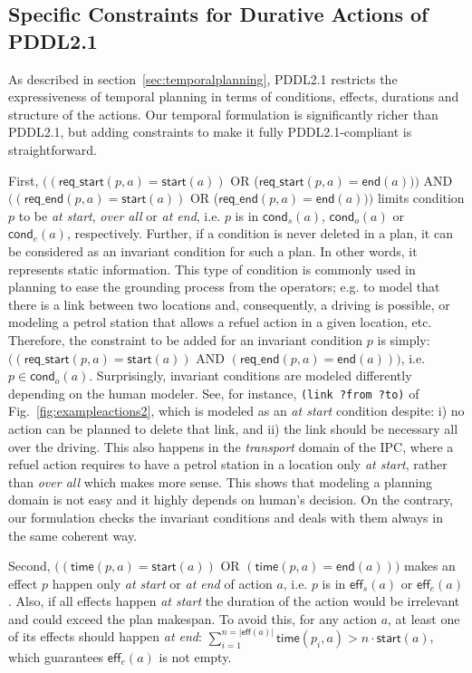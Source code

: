 \documentclass[runningheads]{llncs}
\newcommand{\eff}{\mathsf{eff}}    %
\newcommand{\cond}{\mathsf{cond}}  %
\newcommand{\start}{\mathsf{start}}%
\newcommand{\en}{\mathsf{end}}     %
\newcommand{\tim}{\mathsf{time}}   %
\newcommand{\reqs}{\mathsf{req\_{start}}} %
\newcommand{\reqe}{\mathsf{req\_{end}}}   %
\begin{document}
\subsection{Specific Constraints for Durative Actions of PDDL2.1}
\label{sec:PDDL21constraints}

As described in section~\ref{sec:temporalplanning}, PDDL2.1 restricts the expressiveness of temporal planning in terms of conditions, effects, durations and structure of the actions. Our temporal formulation is significantly richer than PDDL2.1, but adding constraints to make it fully PDDL2.1-compliant is straightforward.


First, $((\reqs(p,a) = \start(a))$ OR ($\reqs(p,a) = \en(a)))$ AND $((\reqe(p,a) = \start(a))$ OR ($\reqe(p,a) = \en(a)))$ limits condition $p$ to be \emph{at start}, \emph{over all} or \emph{at end}, i.e. $p$ is in $\cond_s(a)$, $\cond_o(a)$ or $\cond_e(a)$, respectively.
Further, if a condition is never deleted in a plan, it can be considered as an invariant condition for such a plan. In other words, it represents static information. This type of condition is commonly used in planning to ease the grounding process from the operators; e.g. to model that there is a link between two locations and, consequently, a driving is possible, or modeling a petrol station that allows a refuel action in a given location, etc. Therefore, the constraint to be added for an invariant condition $p$ is simply: $((\reqs(p,a) = \start(a))$ AND $(\reqe(p,a) = \en(a)))$, i.e. $p \in \cond_o(a)$.
Surprisingly, invariant conditions are modeled differently depending on the human modeler. See, for instance, \texttt{(link ?from ?to)} of Fig.~\ref{fig:exampleactions2}, which is modeled as an \emph{at start} condition despite: i) no action can be planned to delete that link, and ii) the link should be necessary all over the driving.
This also happens in the \emph{transport} domain of the IPC, where a refuel action requires to have a petrol station in a location only \emph{at start}, rather than \emph{over all} which makes more sense. This shows that modeling a planning domain is not easy and it highly depends on human's decision. On the contrary, our formulation checks the invariant conditions and deals with them always in the same coherent way.


Second, $((\tim(p,a) = \start(a))$ OR $(\tim(p,a) = \en(a)))$ makes an effect $p$ happen only \emph{at start} or \emph{at end} of action $a$, i.e. $p$ is in $\eff_s(a)$ or $\eff_e(a)$.
Also, if all effects happen \emph{at start} the duration of the action would be irrelevant and could exceed the plan makespan. To avoid this, for any action $a$, at least one of its effects should happen \emph{at end}: $\sum_{i=1}^{n =|\eff(a)|} \tim(p_i,a) > n \cdot \start(a)$, which guarantees $\eff_e(a)$ is not empty.
\end{document}
